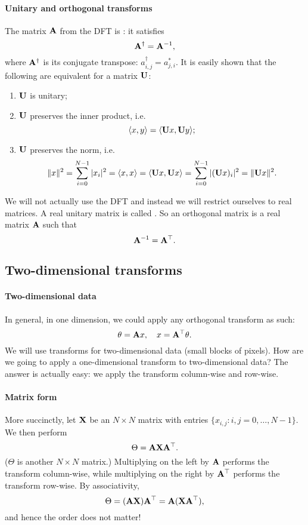 \documentclass[a4paper, 11pt, openany]{book}
\begin{document}
\paragraph{Unitary and orthogonal transforms}
The matrix ${\bf A}$ from the DFT is : it satisfies
\[
    {\bf A}^\dagger = {\bf A}^{-1},
\]
where ${\bf A}^\dagger$ is its conjugate transpose: $a^\dagger_{i,j} = a_{j,i}^*$. It is easily shown that the following are equivalent for a matrix ${\bf U}$:
\begin{enumerate}
    \item ${\bf U}$ is unitary;

    \item ${\bf U}$ preserves the inner product, i.e.
    \[
        \langle x,y \rangle = \langle {\bf U} x, {\bf U}y \rangle;
    \]

    \item ${\bf U}$ preserves the norm, i.e.
    \[
         \| x \|^2 = \sum_{i=0}^{N-1} |x_i|^2 = \langle x,x \rangle = \langle {\bf U} x, {\bf U}x \rangle = \sum_{i=0}^{N-1} |({\bf U}x)_i|^2 = \| {\bf U} x \|^2.
    \]
\end{enumerate}

We will not actually use the DFT and instead we will restrict ourselves to real matrices. A real unitary matrix is called . So an orthogonal matrix is a real matrix ${\bf A}$ such that
\[
    {\bf A}^{-1} = {\bf A}^\top.
\]



\subsection{Two-dimensional transforms}

\paragraph{Two-dimensional data}
In general, in one dimension, we could apply any orthogonal transform as such:
\[
    \theta = {\bf A}x, \quad x = {\bf A}^\top \theta.
\]
We will use transforms for two-dimensional data (small blocks of pixels). How are we going to apply a one-dimensional transform to two-dimensional data? The answer is actually easy: we apply the transform column-wise and row-wise.

\paragraph{Matrix form} More succinctly, let ${\bf X}$ be an $N \times N$ matrix with entries $\{x_{i,j} : i,j = 0, \dots, N-1\}$. We then perform
\[
    \Theta = {\bf A} {\bf X} {\bf A}^\top.
\]
($\Theta$ is another $N \times N$ matrix.) Multiplying on the left by ${\bf A}$ performs the transform column-wise, while multiplying on the right by ${\bf A}^\top$ performs the transform row-wise. By associativity,
\[
    \Theta = ({\bf A} {\bf X}) {\bf A}^\top = {\bf A} ( {\bf X} {\bf A}^\top ),
\]
and hence the order does not matter!
\end{document}
